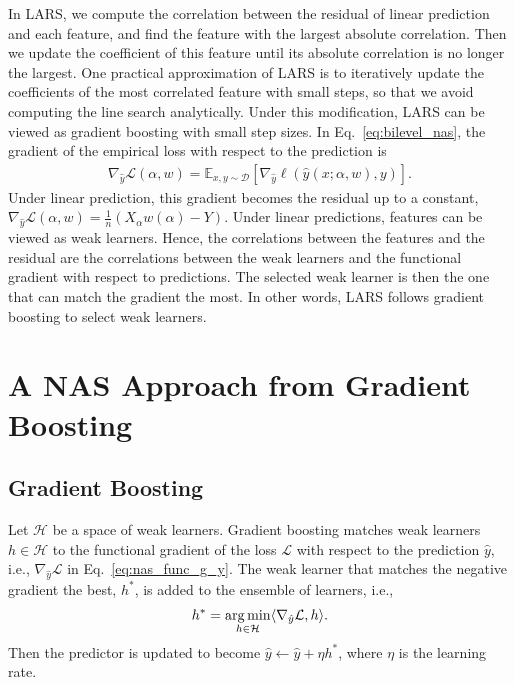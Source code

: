 In LARS, we compute the correlation between the residual of linear prediction and
each feature, and find the feature with the largest absolute correlation. Then we update the 
coefficient of this feature until its absolute correlation is no longer the largest.
One practical approximation of LARS is to iteratively update the coefficients of the most 
correlated feature with small steps, so that we avoid computing the line search analytically. 
Under this modification, LARS can be viewed as gradient boosting with small step sizes.
In Eq.~\ref{eq:bilevel_nas}, the gradient of the empirical loss with respect to the prediction is 
\begin{align}
\nabla _{\hat{y}} \mathcal{L} (\alpha, w) = 
\mathbb{E} _{x, y \sim \mathcal{D}} [ \nabla _{\hat{y}} \ell(\hat{y}(x ; \alpha, w), y) ].
\label{eq:nas_func_g_y}
\end{align}
Under linear prediction, this gradient becomes the residual up to a constant, 
$
\nabla _{\hat{y}} \mathcal{L} (\alpha, w) = \frac{1}{n}(X_{\alpha}w(\alpha) - Y).
$
Under linear predictions, features can be viewed as weak learners. 
Hence, the correlations between the features and the residual are
the correlations between the weak learners and the functional gradient with respect to predictions.
The selected weak learner is then the one that can match the gradient the most.  In other words, 
LARS follows gradient boosting to select weak learners.

\section{A NAS Approach from Gradient Boosting}

\label{sec:search_procedure}

\subsection{Gradient Boosting}
\label{sec:gb_review_nas}
Let $\mathcal{H}$ be a space of weak learners. 
Gradient boosting matches weak learners $h \in \mathcal{H}$ to 
the functional gradient of the loss $\mathcal{L}$ with respect to the prediction $\hat{y}$, 
i.e., $\nabla _{\hat{y}} \mathcal{L}$ in Eq.~\ref{eq:nas_func_g_y}.
The weak learner that matches the negative gradient the best, $h^*$, is added to the ensemble of learners, i.e.,
\begin{align}
h^* = \operatorname*{arg\,min} _{h \in \mathcal{H}} \langle \nabla _{\hat{y}} \mathcal{L}, h \rangle.
\end{align}
Then the predictor is updated to become $\hat{y} \leftarrow \hat{y} + \eta h^*$, where $\eta$ is the learning rate.

